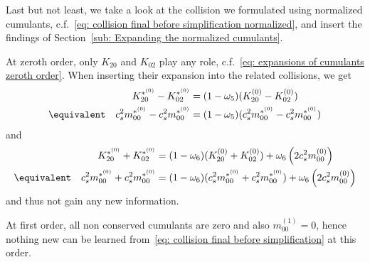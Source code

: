 Last but not least, we take a look at the collision we formulated using normalized cumulants, c.f.~\eqref{eq: collision final before simplification normalized},
and insert the findings of Section~\ref{sub: Expanding the normalized cumulants}.

At zeroth order, only $K_{20}$ and $K_{02}$ play any role, c.f.~\eqref{eq: expansions of cumulants zeroth order}.
When inserting their expansion into the related collisions, we get
\begin{equation}
  \begin{aligned}
    &&K_{20}^{*^{(0)}} - K_{02}^{*^{(0)}}
      & = (1-\omega_5) (K_{20}^{(0)} - K_{02}^{(0)}) \\
    &\equivalent& c_s^2 m_{00}^{*^{(0)}} - c_s^2 m_{00}^{*^{(0)}}
        & = (1-\omega_5) (c_s^2 m_{00}^{*^{(0)}} - c_s^2 m_{00}^{*^{(0)}})
  \end{aligned}
\end{equation}
and
\begin{equation}
  \begin{aligned}
    &&K_{20}^{*^{(0)}} + K_{02}^{*^{(0)}}
      & = (1-\omega_6)(K_{20}^{(0)} + K_{02}^{(0)}) + \omega_6 \left( 2 c_s^2 m_{00}^{(0)} \right) \\
    &\equivalent& c_s^2 m_{00}^{*^{(0)}} + c_s^2 m_{00}^{*^{(0)}}
      & = (1-\omega_6)(c_s^2 m_{00}^{*^{(0)}} + c_s^2 m_{00}^{*^{(0)}}) + \omega_6 \left( 2 c_s^2 m_{00}^{(0)} \right) \\
  \end{aligned}
\end{equation}
and thus not gain any new information.

At first order, all non conserved cumulants are zero and also $m_{00}^{(1)}=0$, hence nothing new can be learned from~\eqref{eq: collision final before simplification} at this order.

